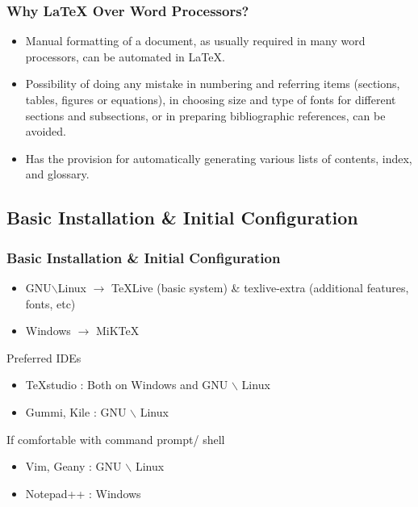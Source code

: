 \documentclass[12pt]{beamer}
\begin{document}
 \begin{frame}
 \frametitle{Why \LaTeX \hspace{1pt} Over Word Processors?}
\begin{itemize}\justifying
	\item Manual formatting of a document,
	as usually required in many word processors, can be automated in \LaTeX. 
	\item Possibility of doing any mistake in numbering and referring items (sections,
	tables, figures or equations), in choosing size and type of fonts for different sections
	and subsections, or in preparing bibliographic references, can be avoided. 
	\item Has the provision for automatically generating various lists of contents, index,
	and glossary. 
\end{itemize}
\end{frame}
\begin{frame}
\section{ Basic Installation \& Initial Configuration}
\frametitle{ Basic Installation \& Initial Configuration}	
\begin{itemize}\justifying
	\item GNU$\backslash$Linux $\rightarrow$ TeXLive (basic system) \& texlive-extra (additional features, fonts, etc)
	\item Windows $\rightarrow$ MiKTeX
\end{itemize}
Preferred IDEs
\begin{itemize}
	\item TeXstudio : Both on Windows and GNU $\backslash$ Linux
	\item Gummi, Kile : GNU $\backslash$ Linux
\end{itemize}
If comfortable with command prompt/ shell 
\begin{itemize}
	\item Vim, Geany : GNU $\backslash$ Linux
	\item Notepad++ : Windows
\end{itemize}
\end{frame}
\end{document}
